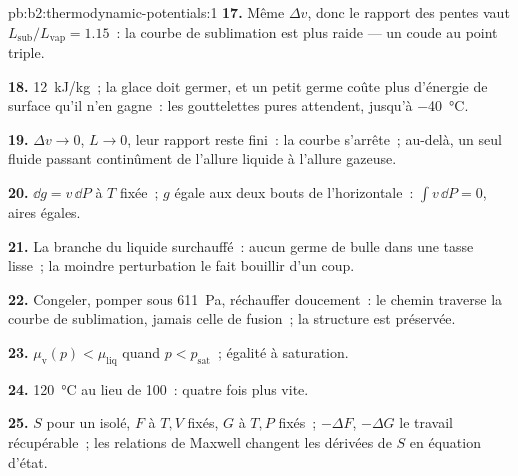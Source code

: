 \begin{solution}{pb:b2:thermodynamic-potentials:1}
\textbf{17.} Même $\Delta v$, donc le rapport des pentes vaut $L_{\text{sub}}/L_{\text{vap}}
= 1.15$~: la courbe de sublimation est plus raide --- un coude au point triple.

\textbf{18.} \qty{12}{kJ/kg}~; la glace doit germer, et un petit germe coûte
plus d'énergie de surface qu'il n'en gagne~: les gouttelettes pures attendent, jusqu'à
\qty{-40}{\celsius}.

\textbf{19.} $\Delta v \to 0$, $L \to 0$, leur rapport reste fini~: la courbe s'arrête~;
au-delà, un seul fluide passant continûment de l'allure liquide à l'allure gazeuse.

\textbf{20.} $\dd g = v\,\dd P$ à $T$ fixée~; $g$ égale aux deux bouts de
l'horizontale~: $\int v\,\dd P = 0$, aires égales.

\textbf{21.} La branche du liquide surchauffé~: aucun germe de bulle dans une
tasse lisse~; la moindre perturbation le fait bouillir d'un coup.

\textbf{22.} Congeler, pomper sous \qty{611}{Pa}, réchauffer doucement~: le chemin
traverse la courbe de sublimation, jamais celle de fusion~; la structure
est préservée.

\textbf{23.} $\mu_{\text{v}}(p) < \mu_{\text{liq}}$ quand $p < p_{\text{sat}}$~; égalité à
saturation.

\textbf{24.} \qty{120}{\celsius} au lieu de \qty{100}{}~: quatre fois plus vite.

\textbf{25.} $S$ pour un isolé, $F$ à $T,V$ fixés, $G$ à $T,P$ fixés~;
$-\Delta F$, $-\Delta G$ le travail récupérable~; les relations de Maxwell changent les
dérivées de $S$ en équation d'état.
\end{solution}
